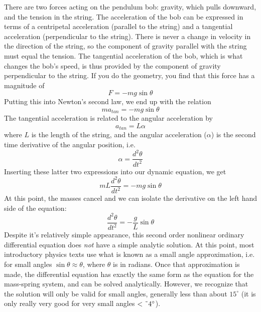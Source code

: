\documentclass[twoside,11pt,ShortChapTitles]{BYUTextbook}
\begin{document}
There are two forces acting on the pendulum bob: gravity, which pulls
downward, and the tension in the string. The acceleration of the bob can be
expressed in terms of a centripetal acceleration (parallel to the string)
and a tangential acceleration (perpendicular to the string). There is never
a change in velocity in the direction of the string, so the component of
gravity parallel with the string must equal the tension. The tangential
acceleration of the bob, which is what changes the bob's speed, is thus
provided by the component of gravity perpendicular to the string. If you do
the geometry, you find that this force has a magnitude of 
\[
F=-mg\sin \theta 
\]%
Putting this into Newton's second law, we end up with the relation 
\[
ma_{tan}=-mg\sin \theta 
\]%
The tangential acceleration is related to the angular acceleration by%
\[
a_{tan}=L\alpha 
\]%
where $L$ is the length of the string, and the angular acceleration ($\alpha 
$) is the second time derivative of the angular position, i.e. 
\[
\alpha =\frac{d^{2}\theta }{dt^{2}} 
\]%
Inserting these latter two expressions into our dynamic equation, we get 
\[
mL\frac{d^{2}\theta }{dt^{2}}=-mg\sin \theta 
\]%
At this point, the masses cancel and we can isolate the derivative on the
left hand side of the equation: 
\[
\frac{d^{2}\theta }{dt^{2}}=-\frac{g}{L}\sin \theta 
\]%
Despite it's relatively simple appearance, this second order nonlinear
ordinary differential equation does \emph{not} have a simple analytic
solution. At this point, most introductory physics texts use what is known
as a small angle approximation, i.e. for small angles $\sin \theta \approx
\theta $, where $\theta $ is in radians. Once that approximation is made,
the differential equation has exactly the same form as the equation for the
mass-spring system, and can be solved analytically. However, we recognize
that the solution will only be valid for small angles, generally less than
about $15^{\circ }$ (it is only really very good for very small angles $<%
\symbol{126}4\unit{%
{{}^\circ}%
}$).
\end{document}
